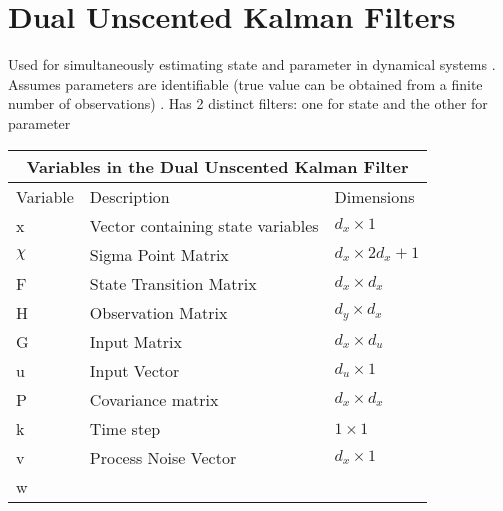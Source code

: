 \chapter{Dual Unscented Kalman Filters}
\label{Dual Unscented Kalman Filters}

Used for simultaneously estimating state and parameter in dynamical systems \cite{inbook, inproceedings, article5}. Assumes parameters are identifiable (true value can be obtained from a finite number of observations) \cite{article5}. Has 2 distinct filters: one for state and the other for parameter \cite{inbook, inproceedings}

\begin{center}
    
\centering
\begin{tabular}{ |p{2cm}||p{5cm}|p{2cm}| }
    \hline
    \multicolumn{3}{|c|}{Variables in the Dual Unscented Kalman Filter } \\ 
    \hline
    Variable & Description & Dimensions \\
    \hline
    x & Vector containing state variables & $d_x \times 1$ \\ 
    $\chi$ & Sigma Point Matrix & $d_x \times 2 d_x + 1 $\\
    F & State Transition Matrix  & $d_x \times d_x $  \\ 
    H & Observation Matrix & $d_y \times d_x$\\
    G & Input Matrix & $d_x \times d_u$\\
    u & Input Vector  & $d_u \times 1$\\
    P & Covariance matrix & $d_x \times d_x$   \\
    k & Time step  & $1 \times 1$\\
    v & Process Noise Vector & $d_x \times 1$\\
    w & & \\
    \hline
\end{tabular}
\end{center}
